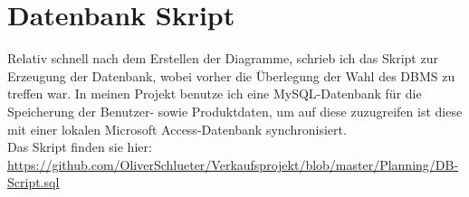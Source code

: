 \newpage

\section{Datenbank Skript}
Relativ schnell nach dem Erstellen der Diagramme, schrieb ich das Skript zur Erzeugung der Datenbank, wobei vorher die Überlegung der Wahl des DBMS zu treffen war. In meinen Projekt benutze ich eine MySQL-Datenbank für die Speicherung der Benutzer- sowie Produktdaten, um auf diese zuzugreifen ist diese mit einer lokalen Microsoft Access-Datenbank synchronisiert.\\
Das Skript finden sie hier: \url{https://github.com/OliverSchlueter/Verkaufsprojekt/blob/master/Planning/DB-Script.sql}